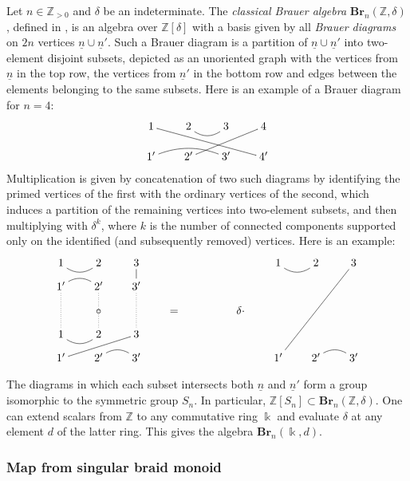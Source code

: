 \documentclass[a4paper]{amsart}
\begin{document}
Let $n\in \mathbb{Z}_{>0}$ and $\delta$ be an indeterminate.
The {\em classical Brauer algebra} $\mathbf{Br}_n(\mathbb{Z},\delta)$, defined in \cite{Br},
is an algebra over $\mathbb{Z}[\delta]$ with a basis given by all
{\em Brauer diagrams} on $2n$ vertices $\underline{n}\cup\underline{n}'$.
Such a Brauer diagram is a partition of $\underline{n}\cup\underline{n}'$
into two-element disjoint subsets, depicted as an unoriented graph
with the vertices from $\underline{n}$ in the top row, 
the vertices from $\underline{n}'$ in the bottom row and  edges 
between the elements belonging to the same subsets. 
Here is an example of a Brauer diagram
for $n=4$:
\begin{displaymath}
\xymatrix@R=5mm@C=7mm{
1\ar@{-}[rrrd]&2\ar@/_8pt/@{-}[r]&3&4\ar@{-}[dll]\\
1'\ar@/^8pt/@{-}[rr]&2'&3'&4'
}
\end{displaymath}
Multiplication is given by concatenation of two such diagrams by identifying
the primed vertices of the first with the ordinary vertices of the second,
which induces a partition of the  remaining vertices into two-element subsets,
and then multiplying with $\delta^k$, where $k$ is the number of connected  
components supported only on the identified (and subsequently removed) vertices.
Here is an example:
\begin{displaymath}
\xymatrix@R=3mm@C=7mm{
1\ar@/_8pt/@{-}[r]&2&3\ar@{-}[d]&&&&1\ar@/_8pt/@{-}[r]&2&3\ar@{-}[ddddll]\\
1'\ar@/^8pt/@{-}[r]\ar@{.}[dd]&2'\ar@{.}[dd]&3'\ar@{.}[dd]\\
&\circ&&=&&\delta\cdot&&\\
1\ar@/_8pt/@{-}[r]&2&3\ar@{-}[dll]\\
1'&2'\ar@/^8pt/@{-}[r]&3'&&&&1'&2'\ar@/^8pt/@{-}[r]&3'\\
}
\end{displaymath}

The diagrams in which each subset intersects both $\underline{n}$ and
$\underline{n}'$ form a group isomorphic to the symmetric group $S_n$.
In particular, $\mathbb{Z}[S_n]\subset \mathbf{Br}_n(\mathbb{Z},\delta)$.
One can extend scalars from $\mathbb{Z}$ to any commutative ring $\Bbbk$
and evaluate $\delta$ at any element $d$ of the latter ring.
This gives the algebra $\mathbf{Br}_n(\Bbbk,d)$.

\subsubsection{Map from singular braid monoid}\label{s4.4.2}
\end{document}
